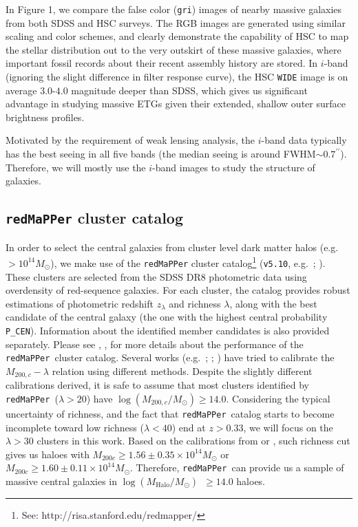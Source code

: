 \documentclass[preprint]{aastex}
\def\arcsec{{\prime\prime}}
\def\redm{\texttt{redMaPPer}}
\def\logmh{{$\log (M_{\mathrm{Halo}}/M_{\odot})$}~}
\begin{document}
\begin{CJK*}{UTF8}{gbsn}
    In Figure 1, we compare the false color ({\tt gri}) images of nearby massive
    galaxies from both SDSS and HSC surveys.  
    The RGB images are generated using similar scaling and color schemes, and clearly
    demonstrate the capability of HSC to map the stellar distribution out to the very 
    outskirt of these massive galaxies, where important fossil records about their 
    recent assembly history are stored.   
    In $i$-band (ignoring the slight difference in filter response curve), the HSC
    \texttt{WIDE} image is on average $3.0$-$4.0$ magnitude deeper than SDSS, which 
    gives us significant advantage in studying massive ETGs given their extended, shallow 
    outer surface brightness profiles. 
    
    Motivated by the requirement of weak lensing analysis, the $i$-band data typically has
    the best seeing in all five bands (the median seeing is around 
    FWHM$\sim 0.7^{\arcsec}$).
    Therefore, we will mostly use the $i$-band images to study the structure of galaxies. 
    
\subsection{\redm{} cluster catalog}

    In order to select the central galaxies from cluster level dark matter halos 
    (e.g.\ $> 10^{14} M_{\odot}$), we make use of the \redm{} cluster 
    catalog\footnote{See: http://risa.stanford.edu/redmapper/} 
    (\texttt{v5.10}, e.g.\ \citealt{Rykoff2014}; \citealt{Rozo2015b}).
    These clusters are selected from the SDSS DR8 photometric data using overdensity of
    red-sequence galaxies. 
    For each cluster, the catalog provides robust estimations of photometric redshift
    $z_{\lambda}$ and richness $\lambda$, along with the best candidate of the central
    galaxy (the one with the highest central probability \texttt{P\_CEN}).
    Information about the identified member candidates is also provided separately. 
    Please see \citet{Rozo2014}, \citet{Rozo2015a}, \citet{Rozo2015b} for more details 
    about the performance of the \redm~cluster catalog.      
    Several works (e.g.\ \citealt{Saro2015}; \citealt{Farahi2016}; \citealt{Simet2016})
    have tried to calibrate the $M_{200, c}-\lambda$ relation using different methods.
    Despite the slightly different calibrations derived, it is safe to assume that most
    clusters identified by \redm~($\lambda > 20$) have $\log (M_{200,c}/M_{\odot}) \geq
    14.0$.  
    Considering the typical uncertainty of richness, and the fact that \redm~catalog
    starts to become incomplete toward low richness ($\lambda < 40$) end at $z > 0.33$, we
    will focus on the $\lambda > 30$ clusters in this work.  
    Based on the calibrations from \citet{Farahi2016} or \citet{Simet2016}, 
    such richness cut gives us haloes with 
    $M_{200c} \geq 1.56\pm0.35 \times 10^{14} M_{\odot}$ or 
    $M_{200c} \geq 1.60\pm0.11 \times 10^{14} M_{\odot}$.  
    Therefore, \redm~can provide us a sample of massive central galaxies in \logmh$\geq
    14.0$ haloes.  
    

\end{CJK*}
\end{document}
